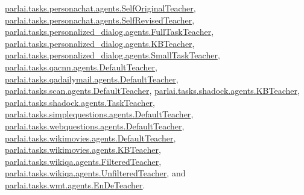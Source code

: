 \hyperlink{classparlai_1_1tasks_1_1personachat_1_1agents_1_1SelfOriginalTeacher}{parlai.\+tasks.\+personachat.\+agents.\+Self\+Original\+Teacher}, \hyperlink{classparlai_1_1tasks_1_1personachat_1_1agents_1_1SelfRevisedTeacher}{parlai.\+tasks.\+personachat.\+agents.\+Self\+Revised\+Teacher}, \hyperlink{classparlai_1_1tasks_1_1personalized__dialog_1_1agents_1_1FullTaskTeacher}{parlai.\+tasks.\+personalized\+\_\+dialog.\+agents.\+Full\+Task\+Teacher}, \hyperlink{classparlai_1_1tasks_1_1personalized__dialog_1_1agents_1_1KBTeacher}{parlai.\+tasks.\+personalized\+\_\+dialog.\+agents.\+K\+B\+Teacher}, \hyperlink{classparlai_1_1tasks_1_1personalized__dialog_1_1agents_1_1SmallTaskTeacher}{parlai.\+tasks.\+personalized\+\_\+dialog.\+agents.\+Small\+Task\+Teacher}, \hyperlink{classparlai_1_1tasks_1_1qacnn_1_1agents_1_1DefaultTeacher}{parlai.\+tasks.\+qacnn.\+agents.\+Default\+Teacher}, \hyperlink{classparlai_1_1tasks_1_1qadailymail_1_1agents_1_1DefaultTeacher}{parlai.\+tasks.\+qadailymail.\+agents.\+Default\+Teacher}, \hyperlink{classparlai_1_1tasks_1_1scan_1_1agents_1_1DefaultTeacher}{parlai.\+tasks.\+scan.\+agents.\+Default\+Teacher}, \hyperlink{classparlai_1_1tasks_1_1shadock_1_1agents_1_1KBTeacher}{parlai.\+tasks.\+shadock.\+agents.\+K\+B\+Teacher}, \hyperlink{classparlai_1_1tasks_1_1shadock_1_1agents_1_1TaskTeacher}{parlai.\+tasks.\+shadock.\+agents.\+Task\+Teacher}, \hyperlink{classparlai_1_1tasks_1_1simplequestions_1_1agents_1_1DefaultTeacher}{parlai.\+tasks.\+simplequestions.\+agents.\+Default\+Teacher}, \hyperlink{classparlai_1_1tasks_1_1webquestions_1_1agents_1_1DefaultTeacher}{parlai.\+tasks.\+webquestions.\+agents.\+Default\+Teacher}, \hyperlink{classparlai_1_1tasks_1_1wikimovies_1_1agents_1_1DefaultTeacher}{parlai.\+tasks.\+wikimovies.\+agents.\+Default\+Teacher}, \hyperlink{classparlai_1_1tasks_1_1wikimovies_1_1agents_1_1KBTeacher}{parlai.\+tasks.\+wikimovies.\+agents.\+K\+B\+Teacher}, \hyperlink{classparlai_1_1tasks_1_1wikiqa_1_1agents_1_1FilteredTeacher}{parlai.\+tasks.\+wikiqa.\+agents.\+Filtered\+Teacher}, \hyperlink{classparlai_1_1tasks_1_1wikiqa_1_1agents_1_1UnfilteredTeacher}{parlai.\+tasks.\+wikiqa.\+agents.\+Unfiltered\+Teacher}, and \hyperlink{classparlai_1_1tasks_1_1wmt_1_1agents_1_1EnDeTeacher}{parlai.\+tasks.\+wmt.\+agents.\+En\+De\+Teacher}.



